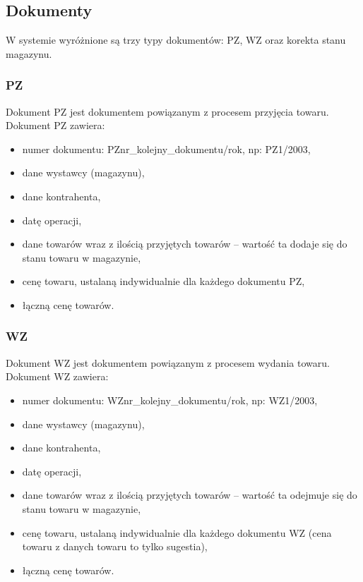 \subsection{Dokumenty}
W systemie wyróżnione są trzy typy dokumentów: PZ, WZ oraz korekta
stanu magazynu.

\subsubsection{PZ}
Dokument PZ jest dokumentem powiązanym z procesem przyjęcia towaru.
Dokument PZ zawiera:
\begin{itemize}
\item numer dokumentu: PZnr\_kolejny\_dokumentu/rok, np: PZ1/2003,
\item dane wystawcy (magazynu),
\item dane kontrahenta,
\item datę operacji,
\item dane towarów wraz z ilością przyjętych towarów -- wartość ta
  dodaje się do stanu towaru w magazynie,
\item cenę towaru, ustalaną indywidualnie dla każdego dokumentu PZ,
\item łączną cenę towarów.
\end{itemize}

\subsubsection{WZ}
Dokument WZ jest dokumentem powiązanym z procesem wydania towaru.
Dokument WZ zawiera:
\begin{itemize}
\item numer dokumentu: WZnr\_kolejny\_dokumentu/rok, np: WZ1/2003,
\item dane wystawcy (magazynu),
\item dane kontrahenta,
\item datę operacji,
\item dane towarów wraz z ilością przyjętych towarów -- wartość ta
  odejmuje się do stanu towaru w magazynie,
\item cenę towaru, ustalaną indywidualnie dla każdego dokumentu WZ
  (cena towaru z danych towaru to tylko sugestia),
\item łączną cenę towarów.
\end{itemize}

